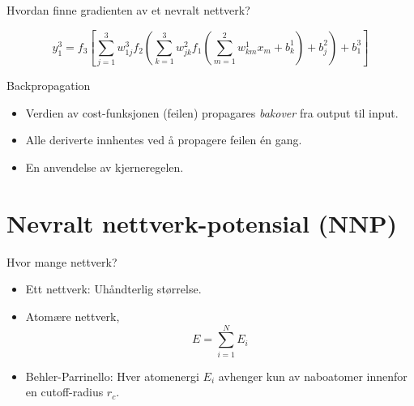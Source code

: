 \documentclass{beamer}
\begin{document}
\begin{frame}{Hvordan finne gradienten av et nevralt nettverk?}

\begin{equation*}
  y_1^3 = f_3\left[\sum_{j=1}^3 w_{1j}^3 f_2\left(\sum_{k=1}^3 w_{jk}^2 f_1\left(\sum_{m=1}^2 w_{km}^1 x_m + b_k^1\right) + b_j^2\right)
  + b_1^3\right]
\end{equation*}

\begin{block}{Backpropagation}
 \begin{itemize} 
  \item Verdien av cost-funksjonen (feilen) propagares \textit{bakover} fra output til input.
  \item Alle deriverte innhentes ved å propagere feilen én gang. 
  \item En anvendelse av kjerneregelen. 
 \end{itemize}
\end{block}

\end{frame}


\section{Nevralt nettverk-potensial (NNP)}


\begin{frame}
 
\begin{block}{Hvor mange nettverk?}
 \begin{itemize}
  \item Ett nettverk: Uhåndterlig størrelse. 
  \item Atomære nettverk,
   \begin{equation*}
    E = \sum_{i=1}^N E_i
   \end{equation*}
   \item Behler-Parrinello: Hver atomenergi $E_i$ avhenger kun av naboatomer innenfor en cutoff-radius $r_c$. 
 \end{itemize}
\end{block}

\end{frame}
\end{document}
